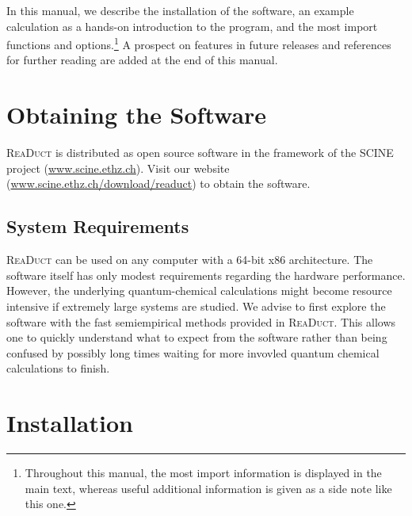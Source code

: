 \documentclass[]{tufte-book}
\begin{document}
In this manual, we describe the installation of the software, an example calculation as a hands-on 
introduction to the program, and the most import functions and options.\footnote{Throughout this manual, the most 
import information is displayed in the main text, whereas useful additional information is given as a side note like this one.}
A prospect on features in future releases and references for further reading are added at the end of this manual.\enlargethispage{\baselineskip}



\chapter{Obtaining the Software}
\label{ch:obtain}

\textsc{ReaDuct}  is distributed as open source software in the framework of the SCINE project (\href{https://scine.ethz.ch/}{www.scine.ethz.ch}).
Visit our website (\href{https://scine.ethz.ch/download/readuct}{www.scine.ethz.ch/download/readuct}) to obtain the software. 


\section{System Requirements}

\textsc{ReaDuct} can be used on any computer with a 64-bit x86 architecture. The software itself has only modest requirements
regarding the hardware performance. However, the underlying quantum-chemical calculations might become resource intensive 
if extremely large systems are studied. We advise to first explore the software with the fast semiempirical methods provided 
in \textsc{ReaDuct}. This allows one to quickly understand what to expect from the software rather than being confused by 
possibly long times waiting for more invovled quantum chemical calculations to finish.



\chapter{Installation}\label{ch:installation}
\end{document}
